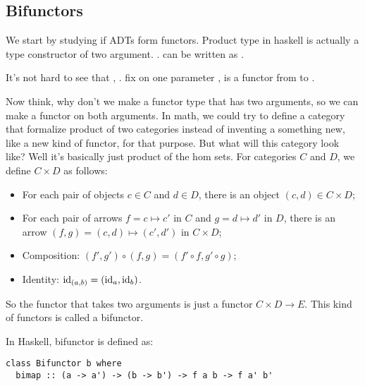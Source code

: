 \setcounter{section}{7}
\setcounter{subsection}{0}
\subsection{Bifunctors}

We start by studying if ADTs form functors. Product type in haskell is
actually a type constructor of two argument. \ie.  can be written as
.

It's not hard to see that , \ie. fix on one parameter , is a
functor from  to .

\begin{center}
\end{center}

Now think, why don't we make a functor type that has two arguments, so we can
make \code{(,)} a functor on both arguments. In math, we could try to define a
category that formalize product of two categories instead of inventing a
something new, like a new kind of functor, for that purpose. But what will this
category look like? Well it's basically just product of the hom sets. For
categories $C$ and $D$, we define $C \times D$ as follows:

\begin{itemize}
\item For each pair of objects $c\in C$ and $d\in D$, there is an object $(c,d)
  \in C\times D$;
\item For each pair of arrows $f=c\mapsto c'$ in $C$ and $g
  = d\mapsto d'$ in $D$, there is an arrow $(f, g)=(c,d)\mapsto (c',d')$ in $C\times D$;
\item Composition: $(f', g') \circ (f, g) = (f'\circ f, g'\circ g)$;
\item Identity: $\mathrm{id}_{(a,b)}=(\mathrm{id}_a, \mathrm{id}_b)$.
\end{itemize}

So the functor that takes two arguments is just a functor $C\times
D \to E$. This kind of functors is called a bifunctor.

In Haskell, bifunctor is defined as:

\begin{lstlisting}
class Bifunctor b where
  bimap :: (a -> a') -> (b -> b') -> f a b -> f a' b'
\end{lstlisting}

